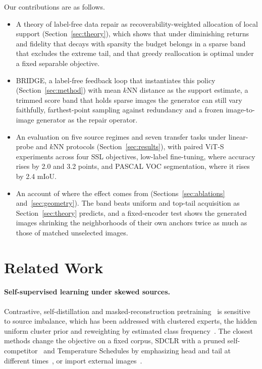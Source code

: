 \documentclass{article}
\newcommand{\method}{BRIDGE}
\begin{document}
Our contributions are as follows.
\begin{itemize}
\setlength{\itemsep}{1pt}
\item A theory of label-free data repair as recoverability-weighted allocation of local support (Section~\ref{sec:theory}), which shows that under diminishing returns and fidelity that decays with sparsity the budget belongs in a sparse band that excludes the extreme tail, and that greedy reallocation is optimal under a fixed separable objective.
\item \method, a label-free feedback loop that instantiates this policy (Section~\ref{sec:method}) with mean $k$NN distance as the support estimate, a trimmed score band that holds sparse images the generator can still vary faithfully, farthest-point sampling against redundancy and a frozen image-to-image generator as the repair operator.
\item An evaluation on five source regimes and seven transfer tasks under linear-probe and $k$NN protocols (Section~\ref{sec:results}), with paired ViT-S experiments across four SSL objectives, low-label fine-tuning, where accuracy rises by 2.0 and 3.2 points, and PASCAL VOC segmentation, where it rises by 2.4 mIoU.
\item An account of where the effect comes from (Sections~\ref{sec:ablations} and~\ref{sec:geometry}). The band beats uniform and top-tail acquisition as Section~\ref{sec:theory} predicts, and a fixed-encoder test shows the generated images shrinking the neighborhoods of their own anchors twice as much as those of matched unselected images.
\end{itemize}

\section{Related Work}
\label{sec:background}
\paragraph{Self-supervised learning under skewed sources.}
Contrastive, self-distillation and masked-reconstruction pretraining~\citep{chen2020simple,he2020momentum,DINO,oquab2023dinov2,dinov3,he2022masked} is sensitive to source imbalance, which has been addressed with clustered experts, the hidden uniform cluster prior and reweighting by estimated class frequency~\citep{tian2021divide,assran2210hidden,fassl}. The closest methods change the objective on a fixed corpus, SDCLR with a pruned self-competitor~\citep{sdclr} and Temperature Schedules by emphasizing head and tail at different times~\citep{ts}, or import external images~\citep{colt}.
\end{document}

